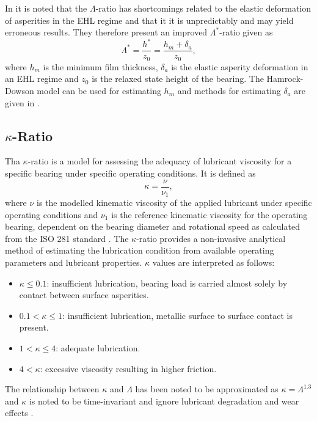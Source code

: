 In \cite{hansen_new_2021} it is noted that the $\Lambda$-ratio has shortcomings related to the elastic deformation of asperities in the EHL regime and that it it is unpredictably and may yield erroneous results. They therefore present an improved $\Lambda^*$-ratio given as
\begin{equation}
\Lambda^* = \frac{h^*}{z_0} = \frac{h_m+\delta_a}{z_0},
\end{equation}
where $h_m$ is the minimum film thickness, $\delta_a$ is the elastic asperity deformation in an EHL regime and $z_0$ is the relaxed state height of the bearing. The Hamrock-Dowson model can be used for estimating $h_m$ and methods for estimating $\delta_a$ are given in \cite{hansen_new_2021}.

\subsection{$\kappa$-Ratio}
Tha $\kappa$-ratio is a model for assessing the adequacy of lubricant viscosity for a specific bearing under specific operating conditions. It is defined as
\begin{equation}
\kappa = \frac{\nu}{\nu_{1}},
\end{equation}
where $\nu$ is the modelled kinematic viscosity of the applied lubricant under specific operating conditions and $\nu_{1}$ is the reference kinematic viscosity for the operating bearing, dependent on the bearing diameter and rotational speed as calculated from the ISO 281 standard \cite{jakobsen_detecting_2023}. The $\kappa$-ratio provides a non-invasive analytical method of estimating the lubrication condition from available operating parameters and lubricant properties. $\kappa$ values are interpreted as follows:
\begin{itemize}
    \item $\kappa \leq 0.1$: insufficient lubrication, bearing load is carried almost solely by contact between surface asperities.
    \item $0.1 < \kappa \leq 1$: insufficient lubrication, metallic surface to surface contact is present.
    \item $1 < \kappa \leq 4$: adequate lubrication.
    \item $4 < \kappa$: excessive viscosity resulting in higher friction.
\end{itemize}
The relationship between $\kappa$ and $\Lambda$ has been noted to be approximated as $\kappa = \Lambda^{1.3}$ and $\kappa$ is noted to be time-invariant and ignore lubricant degradation and wear effects \cite{jakobsen_detecting_2023}.
